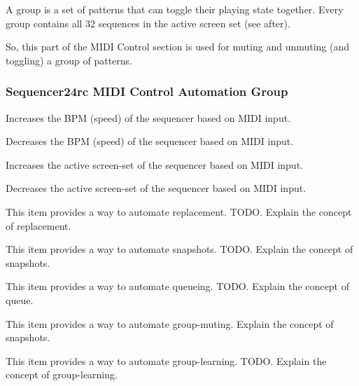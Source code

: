    A group is a set of patterns that can toggle their playing state
   together.  Every group contains all 32 sequences in the active screen set
   (see after).

   So, this part of the MIDI Control section is used for muting and unmuting
   (and toggling) a group of patterns.

\subsubsection{Sequencer24rc MIDI Control Automation Group}
\label{subsubsec:seq24_rc_file_midi_control_automation_group}


   \setcounter{ItemCounter}{0}      %

   Increases the BPM (speed) of the sequencer based on MIDI input.

   Decreases the BPM (speed) of the sequencer based on MIDI input.

   Increases the active screen-set of the sequencer based on MIDI input.

   Decreases the active screen-set of the sequencer based on MIDI input.

   This item provides a way to automate replacement.
   TODO.
   Explain the concept of replacement.

   This item provides a way to automate snapshots.
   TODO.
   Explain the concept of snapshots.

   This item provides a way to automate queueing.
   TODO.
   Explain the concept of queue.

   This item provides a way to automate group-muting.
   Explain the concept of snapshots.

   This item provides a way to automate group-learning.
   TODO.
   Explain the concept of group-learning.

